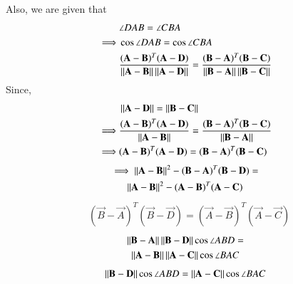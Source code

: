 \documentclass[journal,12pt,twocolumn]{IEEEtran}
\begin{document}
Also, we are given that
\begin{align}
 & \angle DAB  =  \angle CBA \\
 \implies &\cos\angle DAB  =  \cos\angle CBA \\
 &  \frac{(\mathbf A -\mathbf B)^T(\mathbf{A}-\mathbf{D})}{\left\lVert\mathbf{A}-\mathbf{B}\right\rVert \left\lVert\mathbf{A}-\mathbf{D}\right\rVert } = \frac{(\mathbf B -\mathbf A)^T(\mathbf{B}-\mathbf{C})}{\left\lVert\mathbf{B}-\mathbf{A}\right\rVert \left\lVert\mathbf{B}-\mathbf{C}\right\rVert}
 \end{align}
Since,
\begin{align}
	& \left\lVert\mathbf{A}-\mathbf{D}\right\rVert  =  \left\lVert\mathbf{B}-\mathbf{C}\right\rVert \\
	\implies & \frac{(\mathbf A -\mathbf B)^T(\mathbf{A}-\mathbf{D})}{\left\lVert\mathbf{A}-\mathbf{B}\right\rVert} = \frac{(\mathbf B -\mathbf A)^T(\mathbf{B}-\mathbf{C})}{\left\lVert\mathbf{B}-\mathbf{A}\right\rVert} \\
    \implies & (\mathbf A -\mathbf B)^T(\mathbf{A}-\mathbf{D}) =  (\mathbf B -\mathbf A)^T(\mathbf{B}-\mathbf{C})
\end{align}
\begin{multline}
 \implies \left\lVert\mathbf{A}-\mathbf{B}\right\rVert^2 - (\mathbf B -\mathbf A)^T(\mathbf{B}-\mathbf{D})  =\\ \left\lVert\mathbf{A}-\mathbf{B}\right\rVert^2 - (\mathbf A -\mathbf B)^T(\mathbf{A}-\mathbf{C}) 
\end{multline}
\begin{align}
& (\vec B -\vec A)^T(\vec{B}-\vec{D}) = (\vec A -\vec B)^T(\vec{A}-\vec{C})\label{1}
\end{align}
\begin{multline}
 \left\lVert\mathbf{B} - \mathbf{A}\right\rVert\left\lVert\mathbf{B} - \mathbf{D}\right\rVert\cos\angle ABD  = \\ \left\lVert\mathbf{A} - \mathbf{B}\right\rVert\left\lVert\mathbf{A} - \mathbf{C}\right\rVert\cos\angle BAC 	
\end{multline}
\begin{align}
 \left\lVert\mathbf{B} - \mathbf{D}\right\rVert\cos\angle ABD  = \left\lVert\mathbf{A} - \mathbf{C}\right\rVert\cos\angle BAC \label{2}
\end{align}
\end{document}
